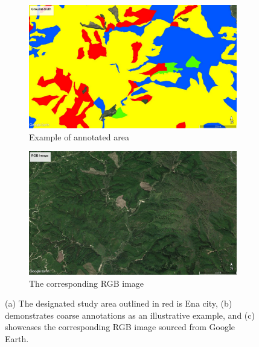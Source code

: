 \begin{figure}[p]
    \begin{subfigure}{.5\textwidth}
      \centering
      \includegraphics[width=\textwidth]{figs/chap5/gt-ge.jpg}
      \caption{Example of annotated area}
      \label{fig:chap5_gtge}
    \end{subfigure}%
    \begin{subfigure}{.5\textwidth}
      \centering
      \includegraphics[width=\textwidth]{figs/chap5/gt-rgb.jpg}
      \caption{The corresponding RGB image}
      \label{fig:chap5_gtrgb}
    \end{subfigure}
    \caption[Study area and annotated data]{(a) The designated study area outlined in red is Ena city, (b) demonstrates coarse annotations as an illustrative example, and (c) showcases the corresponding RGB image sourced from Google Earth.}
    \label{fig:chap5_studyarea_gt}
\end{figure}

